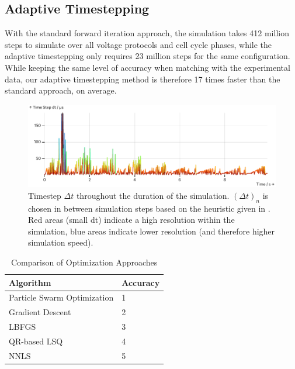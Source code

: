 \documentclass[USenglish,twocolumn]{article}
\begin{document}
  \subsection{Adaptive Timestepping}
  With the standard forward iteration approach, the simulation takes 412 million steps to simulate over all voltage protocols and cell cycle phases, while the adaptive timestepping only requires 23 million steps for the same configuration.
  While keeping the same level of accuracy when matching with the experimental data, our adaptive timestepping method is therefore 17 times faster than the standard approach, on average.

  \begin{figure}
    \includegraphics[width=\columnwidth]{../figures/results/dt-plot.pdf}
    \caption{Timestep $\Delta t$ throughout the duration of the simulation. $(\Delta t)_n$ is chosen in between simulation steps based on the heuristic given in . Red areas (small dt) indicate a high resolution within the simulation, blue areas indicate lower resolution (and therefore higher simulation speed).}
    \label{figure:dt-plot}
  \end{figure}

  \begin{table}
    \caption{Comparison of Optimization Approaches}
    \begin{tabular}{ll}
      \textbf{Algorithm}          & \textbf{Accuracy} \\
      \midrule
      Particle Swarm Optimization & 1                 \\
      Gradient Descent            & 2                 \\
      LBFGS                       & 3                 \\
      QR-based LSQ                & 4                 \\
      NNLS                        & 5                 \\
    \end{tabular}
    \label{table:optimization-comparison}
  \end{table}
\end{document}

